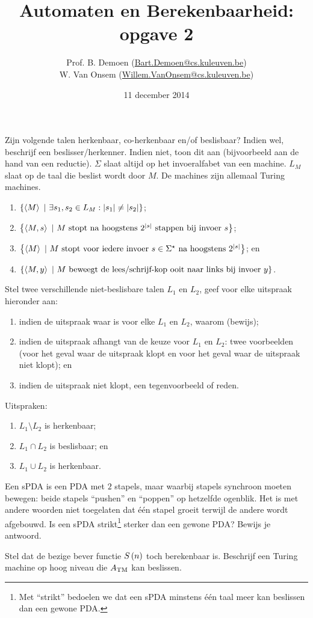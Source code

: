 \documentclass{article}
\title{Automaten en Berekenbaarheid:\\opgave 2}
\author{Prof. B. Demoen (\url{Bart.Demoen@cs.kuleuven.be})\\ W. Van Onsem (\url{Willem.VanOnsem@cs.kuleuven.be})}
\date{11 december 2014}
\begin{document}
\maketitle
\richtlijnen{}

\begin{question}[Berekenbaarheid]
Zijn volgende talen herkenbaar, co-herkenbaar en/of beslisbaar? Indien wel, beschrijf een beslisser/herkenner. Indien niet, toon dit aan (bijvoorbeeld aan de hand van een reductie). $\Sigma$ slaat altijd op het invoeralfabet van een machine. $L_M$ slaat op de taal die beslist wordt door $M$. De machines zijn allemaal Turing machines.
\begin{enumerate}
 \item $\left\{ \left\langle M \right\rangle\ |\ \exists s_1,s_2\in L_M:\left|s_1\right|\neq\left|s_2\right| \right\}$;
 \item $\left\{ \left\langle M,s \right\rangle\ |\ \mbox{$M$ stopt na hoogstens $2^{\left|s\right|}$ stappen bij invoer $s$} \right\}$;
 \item $\left\{ \left\langle M \right\rangle\ |\ \mbox{$M$ stopt voor iedere invoer $s\in\Sigma^{\star}$ na hoogstens $2^{\left|s\right|}$} \right\}$; en
 \item $\left\{ \left\langle M,y \right\rangle\ |\ \mbox{$M$ beweegt de lees/schrijf-kop ooit naar links bij invoer $y$} \right\}$.
\end{enumerate}
\end{question}

\begin{question}
Stel twee verschillende niet-beslisbare talen $L_1$ en $L_2$, geef voor elke uitspraak hieronder aan:
\begin{enumerate}
 \item indien de uitspraak waar is voor elke $L_1$ en $L_2$, waarom (bewijs);
 \item indien de uitspraak afhangt van de keuze voor $L_1$ en $L_2$: twee voorbeelden (voor het geval waar de uitspraak klopt en voor het geval waar de uitspraak niet klopt); en
 \item indien de uitspraak niet klopt, een tegenvoorbeeld of reden.
\end{enumerate}
Uitspraken:
\begin{enumerate}
 \item $L_1\setminus L_2$ is herkenbaar;
 \item $L_1\cap L_2$ is beslisbaar; en
 \item $L_1\cup L_2$ is herkenbaar.
\end{enumerate}
\end{question}

\begin{question}
Een sPDA is een PDA met $2$ stapels, maar waarbij stapels synchroon moeten bewegen: beide stapels ``pushen'' en ``poppen'' op hetzelfde ogenblik. Het is met andere woorden niet toegelaten dat \'e\'en stapel groeit terwijl de andere wordt afgebouwd. Is een sPDA strikt\footnote{Met ``strikt'' bedoelen we dat een sPDA minstens \'e\'en taal meer kan beslissen dan een gewone PDA.} sterker dan een gewone PDA? Bewijs je antwoord.
\end{question}

\begin{question}
Stel dat de bezige bever functie $S\left( n \right)$ toch berekenbaar is. Beschrijf een Turing machine op hoog niveau die $A_{\rm TM}$ kan beslissen.
\end{question}
\end{document}

